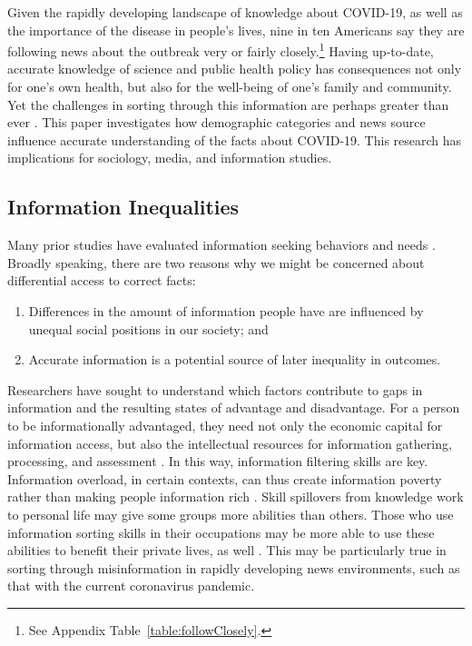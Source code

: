 \documentclass[11pt]{article}
\begin{document}
Given the rapidly developing landscape of knowledge about COVID-19, as well as the importance of the disease in people's lives, nine in ten Americans say they are following news about the outbreak very or fairly closely.\footnote
    {See Appendix Table~\ref{table:followClosely}.} 
Having up-to-date, accurate knowledge of science and public health policy has consequences not only for one's own health, but also for the well-being of one's family and community. Yet the challenges in sorting through this information are perhaps greater than ever \citep{Metaxa-Kakavouli2017}. This paper investigates how demographic categories and news source influence accurate understanding of the facts about COVID-19. This research has implications for sociology, media, and information studies. 


\subsection{Information Inequalities}

Many prior studies have evaluated information seeking behaviors and needs \citep{Case2016}. Broadly speaking, there are two reasons why we might be concerned about differential access to correct facts:

\begin{enumerate}
\def\labelenumi{(\arabic{enumi})}
\item
  Differences in the amount of information people have are influenced by unequal social positions in our society; and
\item
  Accurate information is a potential source of later inequality in outcomes.
\end{enumerate}

Researchers have sought to understand which factors contribute to gaps in information and the resulting states of advantage and disadvantage. For a person to be informationally advantaged, they need not only the economic capital for information access, but also the intellectual resources for information gathering, processing, and assessment \citep{Sweetland1993}. In this way, information filtering skills are key. Information overload, in certain contexts, can thus create information poverty rather than making people information rich \citep{Yu2006}. Skill spillovers from knowledge work to personal life may give some groups more abilities than others. Those who use information sorting skills in their occupations may be more able to use these abilities to benefit their private lives, as well \citep{Edwards2000,Xanthopoulou2012}. This may be particularly true in sorting through misinformation in rapidly developing news environments, such as that with the current coronavirus pandemic. 
\end{document}

